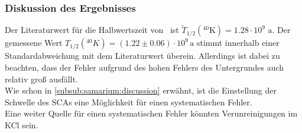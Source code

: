 \subsubsection{Diskussion des Ergebnisses}
Der Literaturwert für die Halbwertszeit von \kalium\, ist $\tilde{T}_{1/2}({}^{40}\text{K}) = 1.28 \cdot 10^{9} \text{ a}$. Der gemessene Wert 
$T_{1/2} \left( {}^{40} K \right) = (1.22 \pm 0.06) \cdot 10^9\,\text{a}$ stimmt innerhalb einer Standardabweichung mit dem Literaturwert überein. 
Allerdings ist dabei zu beachten, dass der Fehler aufgrund des hohen Fehlers des Untergrundes auch relativ groß ausfällt. \\
Wie schon in \ref{subsub:samarium:discussion} erwähnt, ist die Einstellung der Schwelle des SCAs eine Möglichkeit für einen systematischen Fehler. \\
Eine weiter Quelle für einen systematischen Fehler könnten Verunreinigungen im KCl sein.